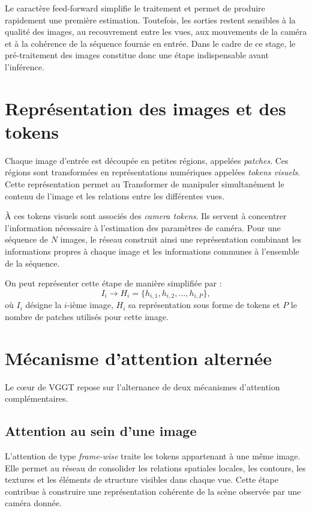 \documentclass[12pt,a4paper,oneside]{report}
\begin{document}
Le caractère feed-forward simplifie le traitement et permet de produire rapidement une première estimation. Toutefois, les sorties restent sensibles à la qualité des images, au recouvrement entre les vues, aux mouvements de la caméra et à la cohérence de la séquence fournie en entrée. Dans le cadre de ce stage, le pré-traitement des images constitue donc une étape indispensable avant l'inférence.

\section{Représentation des images et des tokens}

Chaque image d'entrée est découpée en petites régions, appelées \textit{patches}. Ces régions sont transformées en représentations numériques appelées \textit{tokens visuels}. Cette représentation permet au Transformer de manipuler simultanément le contenu de l'image et les relations entre les différentes vues.

À ces tokens visuels sont associés des \textit{camera tokens}. Ils servent à concentrer l'information nécessaire à l'estimation des paramètres de caméra. Pour une séquence de $N$ images, le réseau construit ainsi une représentation combinant les informations propres à chaque image et les informations communes à l'ensemble de la séquence.

On peut représenter cette étape de manière simplifiée par :
\begin{equation}
    I_i \longrightarrow H_i = \{h_{i,1}, h_{i,2}, \ldots, h_{i,P}\},
\end{equation}
où $I_i$ désigne la $i$-ième image, $H_i$ sa représentation sous forme de tokens et $P$ le nombre de patches utilisés pour cette image.

\section{Mécanisme d'attention alternée}

Le cœur de VGGT repose sur l'alternance de deux mécanismes d'attention complémentaires.

\subsection{Attention au sein d'une image}

L'attention de type \textit{frame-wise} traite les tokens appartenant à une même image. Elle permet au réseau de consolider les relations spatiales locales, les contours, les textures et les éléments de structure visibles dans chaque vue. Cette étape contribue à construire une représentation cohérente de la scène observée par une caméra donnée.
\end{document}
